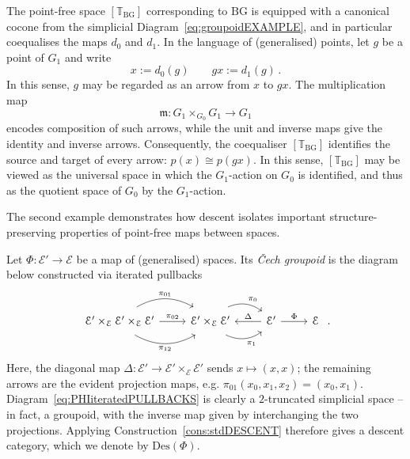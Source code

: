 \documentclass[a4paper, 11pt,reqno]{amsart}
\newcommand{\m}{\mathfrak{m}}
\newcommand{\thT}{\mathbb{T}}
\newcommand{\Des}{\mathrm{Des}}
\newcommand{\E}{\mathcal{E}}
\newcommand{\BG}{\mathrm{BG}}
\begin{document}
\begin{discussion} The point-free space $[\thT_{\BG}]$ corresponding to $\BG$ is equipped with a canonical cocone from the simplicial Diagram~\eqref{eq:groupoidEXAMPLE}, and in particular coequalises the maps $d_0$ and $d_1$. In the language of (generalised) points, let $g$ be a point of $G_1$ and write
	$$x:= d_0(g)\qquad gx:=d_1(g)\,.$$
In this sense, $g$ may be regarded as an arrow from $x$ to $gx$. The multiplication map
$$\m\colon G_1\times_{G_0}G_1\longrightarrow G_1$$
encodes composition of such arrows, while the unit and inverse maps give the identity and inverse arrows. Consequently, the coequaliser $[\thT_\BG]$ identifies the source and target of every arrow: $p(x)\cong p(gx)$. In this sense, $[\thT_\BG]$ may be viewed as the universal space in which the $G_1$-action on $G_0$ is identified, and thus as the quotient space of $G_0$ by the $G_1$-action.
\end{discussion}

The second example demonstrates how descent isolates important structure-preserving properties of point-free maps between spaces. 

\begin{example}\label{ex:DescentGEOMMORPHISM} Let $\Phi\colon \E'\rightarrow \E$ be a map of (generalised) spaces. Its {\em \v{C}ech groupoid} is the diagram below constructed via iterated pullbacks
	\begin{equation}\label{eq:PHIiteratedPULLBACKS} \begin{tikzcd} \E'\times_{\E} \E'\times_{\E} \E' \ar[r, bend right, shift right=1ex, swap,"\pi_{12}"] \ar[r,"\pi_{02}"] \ar[r,bend left, shift left=1ex,  "\pi_{01}"]& \E'\times_\E \E' \ar[r, bend right,shift right=1ex, swap, "\pi_1"] \ar[r, bend left, shift left=1ex, "\pi_0"] &\E' \ar[l, swap, "\Delta"] \ar[r,"\Phi"] & \E
	\end{tikzcd}\,\,.
	\end{equation}
Here, the diagonal map $\Delta\colon \E'\rightarrow \E'\times_\E \E'$ sends $x\mapsto (x,x)$; the remaining arrows are the evident projection maps, e.g. $\pi_{01}(x_0,x_1,x_2)=(x_0,x_1).$ Diagram~\eqref{eq:PHIiteratedPULLBACKS} is clearly a $2$-truncated simplicial space -- in fact, a groupoid, with the inverse map given by interchanging the two projections. Applying Construction~\ref{cons:stdDESCENT} therefore gives a descent category, which we denote by $\Des(\Phi)$.
\end{example}
\end{document}

